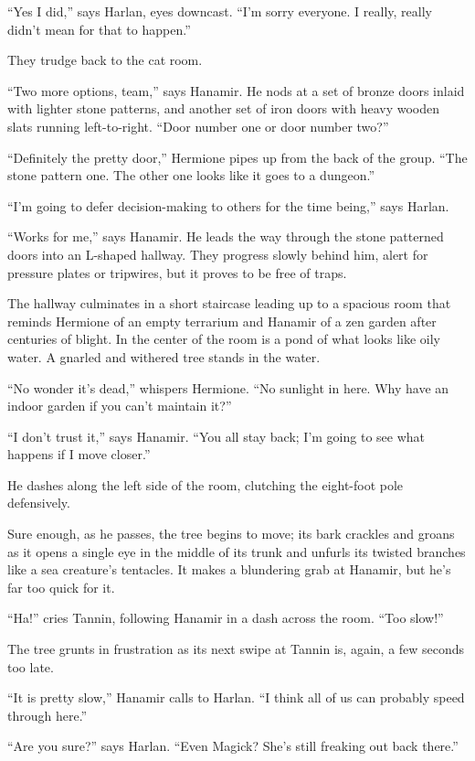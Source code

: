 \documentclass[smalldemyvopaper,11pt,twoside,onecolumn,openright,extrafontsizes]{memoir}
\begin{document}
``Yes I did,'' says Harlan, eyes downcast. ``I'm sorry everyone. I
really, really didn't mean for that to happen.''

They trudge back to the cat room.

``Two more options, team,'' says Hanamir. He nods at a set of bronze
doors inlaid with lighter stone patterns, and another set of iron doors
with heavy wooden slats running left-to-right. ``Door number one or door
number two?''

``Definitely the pretty door,'' Hermione pipes up from the back of the
group. ``The stone pattern one. The other one looks like it goes to a
dungeon.''

``I'm going to defer decision-making to others for the time being,''
says Harlan.

``Works for me,'' says Hanamir. He leads the way through the stone
patterned doors into an L-shaped hallway. They progress slowly behind
him, alert for pressure plates or tripwires, but it proves to be free of
traps.

The hallway culminates in a short staircase leading up to a spacious
room that reminds Hermione of an empty terrarium and Hanamir of a zen
garden after centuries of blight. In the center of the room is a pond of
what looks like oily water. A gnarled and withered tree stands in the
water.

``No wonder it's dead,'' whispers Hermione. ``No sunlight in here. Why
have an indoor garden if you can't maintain it?''

``I don't trust it,'' says Hanamir. ``You all stay back; I'm going to
see what happens if I move closer.''

He dashes along the left side of the room, clutching the eight-foot pole
defensively.

Sure enough, as he passes, the tree begins to move; its bark crackles
and groans as it opens a single eye in the middle of its trunk and
unfurls its twisted branches like a sea creature's tentacles. It makes a
blundering grab at Hanamir, but he's far too quick for it.

``Ha!'' cries Tannin, following Hanamir in a dash across the room. ``Too
slow!''

The tree grunts in frustration as its next swipe at Tannin is, again, a
few seconds too late.

``It is pretty slow,'' Hanamir calls to Harlan. ``I think all of us can
probably speed through here.''

``Are you sure?'' says Harlan. ``Even Magick? She's still freaking out
back there.''
\end{document}
